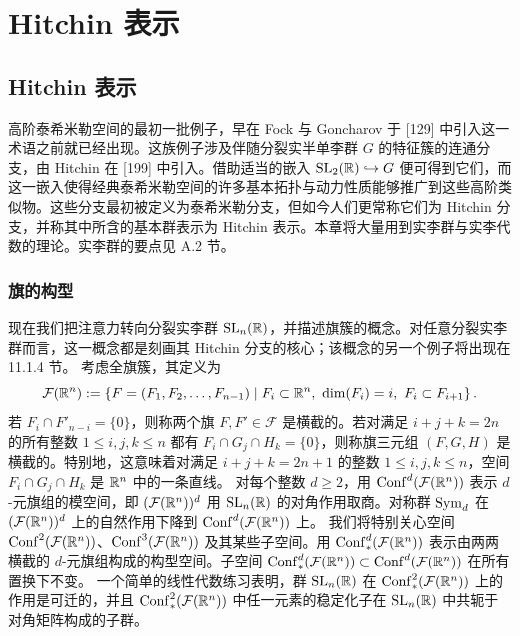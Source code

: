 
\chapter{Hitchin 表示}


\section{Hitchin 表示}

高阶泰希米勒空间的最初一批例子，早在 Fock 与 Goncharov 于 [129] 中引入这一术语之前就已经出现。这族例子涉及伴随分裂实半单李群 $G$ 的特征簇的连通分支，由 Hitchin 在 [199] 中引入。借助适当的嵌入 $\operatorname{SL}_2(\mathbb{R})\hookrightarrow G$ 便可得到它们，而这一嵌入使得经典泰希米勒空间的许多基本拓扑与动力性质能够推广到这些高阶类似物。这些分支最初被定义为泰希米勒分支，但如今人们更常称它们为 Hitchin 分支，并称其中所含的基本群表示为 Hitchin 表示。本章将大量用到实李群与实李代数的理论。实李群的要点见 A.2 节。

\subsection{旗的构型}

现在我们把注意力转向分裂实李群 $\operatorname{SL}_n(\mathbb{R})$，并描述旗簇的概念。对任意分裂实李群而言，这一概念都是刻画其 Hitchin 分支的核心；该概念的另一个例子将出现在 11.1.4 节。
考虑全旗簇，其定义为
\[
\mathcal{F}(\R^n) := \left\{F=(F_1,F_2,\dots,F_{n-1}) \mid F_i\subset\R^n,\ \dim(F_i)=i,\ F_i\subset F_{i+1}\right\}.
\]
若 $F_i\cap F'_{n-i}=\{0\}$，则称两个旗 $F,F'\in\mathcal{F}$ 是横截的。若对满足 $i+j+k=2n$ 的所有整数 $1\le i,j,k\le n$ 都有 $F_i\cap G_j\cap H_k=\{0\}$，则称旗三元组 $(F,G,H)$ 是横截的。特别地，这意味着对满足 $i+j+k=2n+1$ 的整数 $1\le i,j,k\le n$，空间 $F_i\cap G_j\cap H_k$ 是 $\mathbb{R}^n$ 中的一条直线。
对每个整数 $d\ge2$，用 $\mathrm{Conf}^d(\mathcal{F}(\mathbb{R}^n))$ 表示 $d$-元旗组的模空间，即 $(\mathcal{F}(\mathbb{R}^n))^d$ 用 $\operatorname{SL}_n(\mathbb{R})$ 的对角作用取商。对称群 $\operatorname{Sym}_d$ 在 $(\mathcal{F}(\mathbb{R}^n))^d$ 上的自然作用下降到 $\mathrm{Conf}^d(\mathcal{F}(\mathbb{R}^n))$ 上。
我们将特别关心空间 $\mathrm{Conf}^2(\mathcal{F}(\mathbb{R}^n))$、$\mathrm{Conf}^3(\mathcal{F}(\mathbb{R}^n))$ 及其某些子空间。用 $\mathrm{Conf}^d_*(\mathcal{F}(\mathbb{R}^n))$ 表示由两两横截的 $d$-元旗组构成的构型空间。子空间 $\mathrm{Conf}^d_*(\mathcal{F}(\mathbb{R}^n))\subset\mathrm{Conf}^d(\mathcal{F}(\mathbb{R}^n))$ 在所有置换下不变。
一个简单的线性代数练习表明，群 $\operatorname{SL}_n(\mathbb{R})$ 在 $\mathrm{Conf}^2_*(\mathcal{F}(\mathbb{R}^n))$ 上的作用是可迁的，并且 $\mathrm{Conf}^2_*(\mathcal{F}(\mathbb{R}^n))$ 中任一元素的稳定化子在 $\operatorname{SL}_n(\mathbb{R})$ 中共轭于对角矩阵构成的子群。


